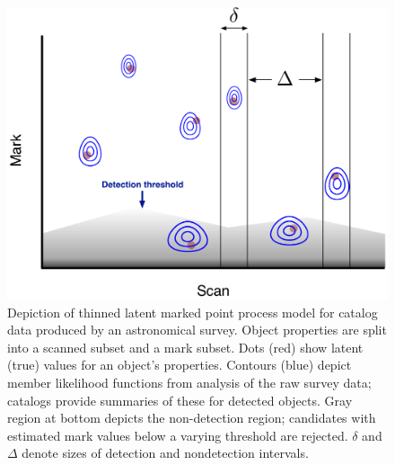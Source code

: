 \documentclass[12pt]{article}
\numberwithin{equation}{section}
\numberwithin{figure}{section}
\numberwithin{table}{section}
\begin{document}
\begin{figure}
\begin{center}
\includegraphics[width=.8\textwidth]{fig/ScanMarkPtProcess-Thin+Err}
\end{center}
\caption{Depiction of thinned latent marked point process model for catalog data produced by an astronomical survey.
Object properties are split into a scanned subset and a mark subset.
Dots (red) show latent (true) values for an object's properties.
Contours (blue) depict member likelihood functions from analysis of the raw survey data; catalogs provide summaries of these for detected objects.
Gray region at bottom depicts the non-detection region; candidates with estimated mark values below a varying threshold are rejected.
$\delta$ and $\Delta$ denote sizes of detection and nondetection intervals.}
\label{fig:ScanMark}
\end{figure}
\end{document}
